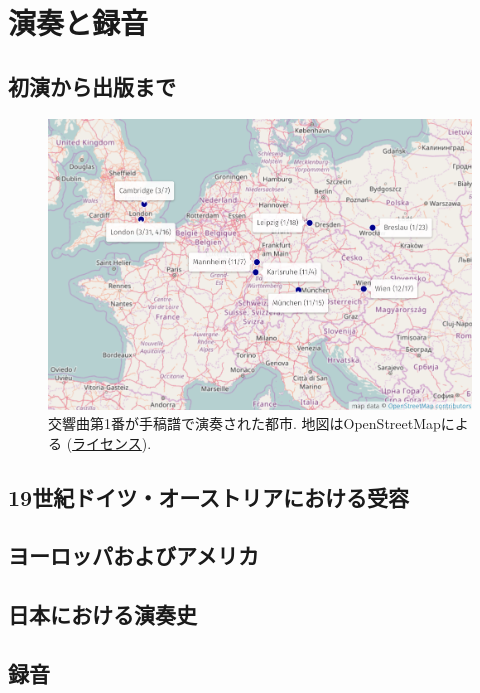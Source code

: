 
\chapter{演奏と録音}

\section{初演から出版まで}\label{sec: till publication}

\begin{figure}[htbp]
	\begin{center}
    \includegraphics[clip,width=14.0cm]{./figure/map-concert.png}
	\caption{交響曲第1番が手稿譜で演奏された都市.
		地図はOpenStreetMapによる (\href{http://www.openstreetmap.org/copyright}{ライセンス}).}
    \label{fig: concert}
	\end{center}
\end{figure}

\section{19世紀ドイツ・オーストリアにおける受容}

\section{ヨーロッパおよびアメリカ}

\section{日本における演奏史}

\section{録音}

